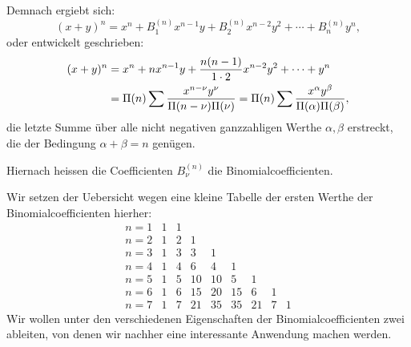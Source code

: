 \documentclass[11pt]{article}
\begin{document}
Demnach ergiebt sich:
\begin{equation}
 (x+y)^n=x^n+B_1^{(n)}x^{n-1}y+B_2^{(n)}x^{n-2}y^2+\cdots+B_n^{(n)}y^n,
\tag{1}
\end{equation}
oder entwickelt geschrieben:
\[
\begin{aligned}
(x+y)^n
&=x^n+nx^{n-1}y+{n(n-1)\over 1\cdot2}x^{n-2}y^2+\cdots+y^n\\
&=\Pi(n)\sum {x^{n-\nu}y^\nu\over \Pi(n-\nu)\Pi(\nu)}
 =\Pi(n)\sum {x^\alpha y^\beta\over \Pi(\alpha)\Pi(\beta)},
\end{aligned}
\]
die letzte Summe über alle nicht negativen ganzzahligen Werthe $\alpha,\beta$ erstreckt, die der Bedingung $\alpha+\beta=n$ genügen.

Hiernach heissen die Coefficienten $B_\nu^{(n)}$ die Binomialcoefficienten.

Wir setzen der Uebersicht wegen eine kleine Tabelle der ersten Werthe der Binomialcoefficienten hierher:
\[
\begin{array}{c|rrrrrrrr}
 n=1&1&1\\
 n=2&1&2&1\\
 n=3&1&3&3&1\\
 n=4&1&4&6&4&1\\
 n=5&1&5&10&10&5&1\\
 n=6&1&6&15&20&15&6&1\\
 n=7&1&7&21&35&35&21&7&1
\end{array}
\]
Wir wollen unter den verschiedenen Eigenschaften der Binomialcoefficienten zwei ableiten, von denen wir nachher eine interessante Anwendung machen werden.
\end{document}
